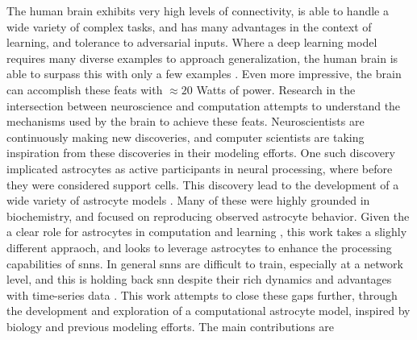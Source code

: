 \documentclass[conference]{IEEEtran}
\begin{document}


The human brain exhibits very high levels of connectivity, is able to handle a
wide variety of complex tasks, and has many advantages in the context of
learning, and tolerance to adversarial inputs. Where a deep learning model
requires many diverse examples to approach generalization, the human brain is
able to surpass this with only a few examples \parencite{tsimenidis_2020}. Even
more impressive, the brain can accomplish these feats with $\approx 20$ Watts of
power. Research in the intersection between neuroscience and computation
attempts to understand the mechanisms used by the brain to achieve these
feats. Neuroscientists are continuously making new discoveries, and computer
scientists are taking inspiration from these discoveries in their modeling
efforts. One such discovery implicated astrocytes as active participants in
neural processing, where before they were considered support cells. This
discovery lead to the development of a wide variety of astrocyte models
\cite{manninen_2019}. Many of these were highly grounded in biochemistry, and
focused on reproducing observed astrocyte behavior. Given the a clear role for
astrocytes in computation and learning \parencite{mederos_2018}, this work takes
a slighly different appraoch, and looks to leverage astrocytes to enhance the
processing capabilities of \glspl{snn}. In general \glspl{snn} are difficult to
train, especially at a network level, and this is holding back \gls{snn} despite
their rich dynamics and advantages with time-series data
\parencite{tavanaei_2019}. This work attempts to close these gaps further,
through the development and exploration of a computational astrocyte model,
inspired by biology and previous modeling efforts. The main contributions are
\end{document}
